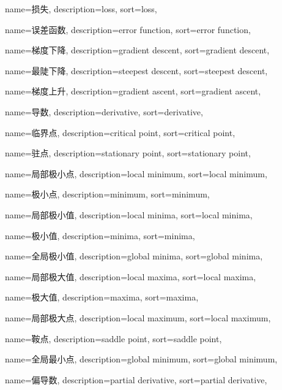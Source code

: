{
	name=损失,
	description={loss},
	sort={loss},
}

{
  name=误差函数,
  description={error function},
  sort={error function},
}

{
  name=梯度下降,
  description={gradient descent},
  sort={gradient descent},
}


{
	name=最陡下降,
	description={steepest descent},
	sort={steepest descent},
}

{
  name=梯度上升,
  description={gradient ascent},
  sort={gradient ascent},
}

{
  name=导数,
  description={derivative},
  sort={derivative},
}

{
  name=临界点,
  description={critical point},
  sort={critical point},
}

{
  name=驻点,
  description={stationary point},
  sort={stationary point},
}

{
  name=局部极小点,
  description={local minimum},
  sort={local minimum},
}

{
	name=极小点,
	description={minimum},
	sort={minimum},
}

{
  name=局部极小值,
  description={local minima},
  sort={local minima},
}

{
	name=极小值,
	description={minima},
	sort={minima},
}


{
	name=全局极小值,
	description={global minima},
	sort={global minima},
}

{
  name=局部极大值,
  description={local maxima},
  sort={local maxima},
}

{
	name=极大值,
	description={maxima},
	sort={maxima},
}

{
  name=局部极大点,
  description={local maximum},
  sort={local maximum},
}

{
  name=鞍点,
  description={saddle point},
  sort={saddle point},
}

{
  name=全局最小点,
  description={global minimum},
  sort={global minimum},
}

{
  name=偏导数,
  description={partial derivative},
  sort={partial derivative},
}

